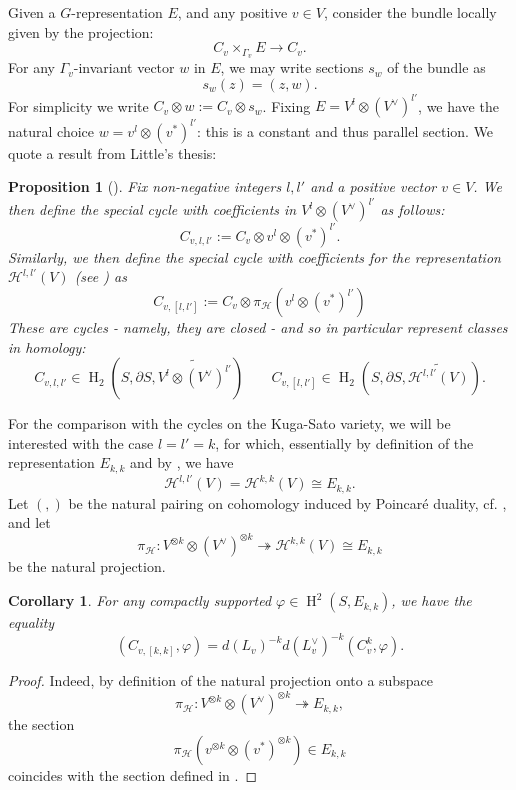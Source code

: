 \documentclass[12pt,a4paper,reqno]{amsart}
\theoremstyle{definition}
\numberwithin{definition}{subsection}
\theoremstyle{definition}
\numberwithin{Definition}{subsection}
\theoremstyle{remark}
\theoremstyle{remark}
\numberwithin{Remark}{subsection}
\theoremstyle{remark}
\theoremstyle{plain}
\numberwithin{Theorem}{subsection}
\theoremstyle{plain}
\theoremstyle{plain}
\theoremstyle{plain}
\newtheorem{Corollary}[Theorem]{Corollary}
\theoremstyle{plain}
\theoremstyle{plain}
\theoremstyle{plain}
\newtheorem{Proposition}[Theorem]{Proposition}
\theoremstyle{plain}
\DeclareMathOperator{\h}{H}
\begin{document}
Given a $G$-representation $E$, and any positive $v\in V$, consider the bundle locally given by the projection:
\[
C_v\times_{\Gamma_v} E\to C_v.
\]
For any $\Gamma_v$-invariant vector $w$ in $E$, we may write sections $s_w$ of the bundle as
\[
s_w(z)=(z,w).
\]
For simplicity we write $C_v\otimes w:= C_v\otimes s_w$.  Fixing $E=V^l\otimes (V^\vee)^{l'}$, we have the natural choice $w=v^l\otimes (v^*)^{l'}$: this is a constant and thus parallel section. We quote a result from Little's thesis:
\begin{Proposition}[]
Fix non-negative integers $l,l'$ and a positive vector $v\in V$. We then
define the special cycle with coefficients in $V^l\otimes (V^\vee)^{l'}$ as follows:
\[
C_{v,l,l'}:=C_v\otimes v^l\otimes (v^*)^{l'}.
\]
Similarly, we then define the special cycle with coefficients for the representation $\mathcal{H}^{l,l'}(V)$ (see \emph{\cite[p. 40]{little}}) as
\[
C_{v,[l,l']}:=C_v\otimes \pi_{\mathcal{H}}(v^l\otimes (v^*)^{l'})
\]
These are cycles - namely, they are closed - and so in particular represent classes in
homology:
\[
C_{v,l,l'}\in \h_2(S,\partial S, \widetilde{V^l\otimes (V^\vee)^{l'}})\;\;\;\;\;\;\; C_{v,[l,l']}\in \h_2(S,\partial S, \widetilde{\mathcal{H}^{l,l'}(V)}).
\]
\end{Proposition}
\noindent For the comparison with the cycles on the Kuga-Sato variety, we will be interested with the case $l=l'=k$, for which, essentially by definition of the representation $E_{k,k}$ and by \cite[Theorem 3.1.2]{little}, we have 
\[
\mathcal{H}^{l,l'}(V)=\mathcal{H}^{k,k}(V)\cong E_{k,k}.
\]
Let $(,)$ be the natural pairing on cohomology induced by Poincaré duality, cf. \cite[p. 46]{little}, and let 
\[
\pi_{\mathcal{H}}: V^{\otimes k}\otimes (V^\vee)^{\otimes k}\twoheadrightarrow  \mathcal{H}^{k,k}(V) \cong E_{k,k}
\]
be the natural projection.
\begin{Corollary}
For any compactly supported $\varphi\in \h^2(S,E_{k,k})$, we have the equality 
\[
(C_{v,[k,k]},\varphi)=d(L_v)^{-k}d(L_v^\vee)^{-k}(C_v^k,\varphi).
\]
\end{Corollary}
\begin{proof}
Indeed, by definition of the natural projection onto a subspace
\[
\pi_{\mathcal{H}}:V^{\otimes k}\otimes (V^\vee)^{\otimes k}\twoheadrightarrow E_{k,k},
\]
the section
\[
\pi_{\mathcal{H}}(v^{\otimes k}\otimes (v^*)^{\otimes k})\in E_{k,k}
\]
coincides with the section defined in \cite[p. 51]{little}.
\end{proof}
\end{document}
